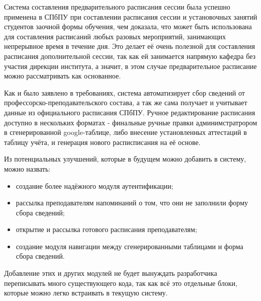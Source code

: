 Система составления предварительного расписания сессии была успешно применена в СПбПУ при составлении расписания сессии и установочных занятий студентов заочной формы обучения, чем доказала, что может быть использована для составления расписаний любых разовых мероприятий, занимающих непрерывное время в течение дня. Это делает её очень полезной для составления расписания дополнительной сессии, так как ей занимается напрямую кафедра без участия дирекции института, а значит, в этом случае предварительное расписание можно рассматривать как основанное.

Как и было заявлено в требованиях, система автоматизирует сбор сведений от профессорско-преподавательского состава, а так же сама получает и учитывает данные из официального расписания СПбПУ. Ручное редактирование расписания доступно в нескольких форматах - финальные ручные правки админимстратрором в сгенерированной google-таблице, либо внесение установленных аттестаций в таблицу учёта, и генерация нового расписписания на её основе.

Из потенциальных улучшений, которые в будущем можно добавить в систему, можно назвать:
\begin{itemize}
	\item создание более надёжного модуля аутентификации;
	\item рассылка преподавателям напоминаний о том, что они не заполнили форму сбора сведений;
	\item открытие и рассылка готового расписания преподавателям;
	\item создание модуля навигации между сгенерированными таблицами и форма сбора сведений.
\end{itemize} 	

Добавление этих и других модулей не будет вынуждать разработчика переписывать много существующего кода, так как всё это отдельные блоки, которые можно легко встраивать в текущую систему.